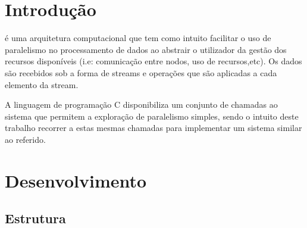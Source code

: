 \documentclass[12pt]{article}
\begin{document}
\section{Introdução}
 é uma arquitetura computacional que tem como intuito facilitar o uso de paralelismo no processamento de dados ao abstrair o utilizador da gestão dos recursos disponíveis (i.e: comunicação entre nodos, uso de recursos,etc). Os dados são recebidos sob a forma de streams e operações que são aplicadas a cada elemento da stream. 

A linguagem de programação C disponibiliza um conjunto de chamadas ao sistema que permitem a exploração de paralelismo simples, sendo o intuito deste trabalho recorrer a estas mesmas chamadas para implementar um sistema similar ao referido.


\newpage


\section{Desenvolvimento} 

\subsection{Estrutura}
\end{document}
